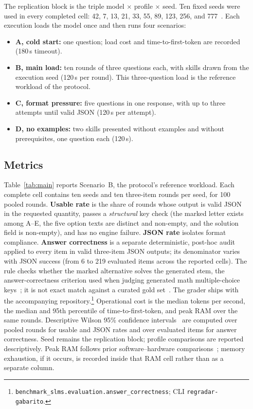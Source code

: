 \documentclass[fleqn,10pt]{JLA_article}
\begin{document}
The replication block is the triple model $\times$ profile $\times$ seed. Ten fixed seeds were used in every completed cell: 42, 7, 13, 21, 33, 55, 89, 123, 256, and 777~\autocite{anonymous2026benchmark}. Each execution loads the model once and then runs four scenarios:
\begin{itemize}
  \item \textbf{A, cold start:} one question; load cost and time-to-first-token are recorded (180\,s timeout).
  \item \textbf{B, main load:} ten rounds of three questions each, with skills drawn from the execution seed (120\,s per round). This three-question load is the reference workload of the protocol.
  \item \textbf{C, format pressure:} five questions in one response, with up to three attempts until valid JSON (120\,s per attempt).
  \item \textbf{D, no examples:} two skills presented without examples and without prerequisites, one question each (120\,s).
\end{itemize}

\subsection{Metrics}
Table~\ref{tab:main} reports Scenario~B, the protocol's reference workload. Each complete cell contains ten seeds and ten three-item rounds per seed, for 100 pooled rounds. \textbf{Usable rate} is the share of rounds whose output is valid JSON in the requested quantity, passes a \emph{structural} key check (the marked letter exists among A--E, the five option texts are distinct and non-empty, and the solution field is non-empty), and has no engine failure. \textbf{JSON rate} isolates format compliance. \textbf{Answer correctness} is a separate deterministic, post-hoc audit applied to every item in valid three-item JSON outputs; its denominator varies with JSON success (from 6 to 219 evaluated items across the reported cells). The rule checks whether the marked alternative solves the generated stem, the answer-correctness criterion used when judging generated math multiple-choice keys~\autocite{lee2024hedge}; it is not exact match against a curated gold set~\autocite{anonymous2026benchmark}. The grader ships with the accompanying repository.\footnote{\texttt{benchmark\_slms.evaluation.answer\_correctness}; CLI \texttt{regradar-gabarito}.} Operational cost is the median tokens per second, the median and 95th percentile of time-to-first-token, and peak RAM over the same rounds. Descriptive Wilson 95\% confidence intervals~\autocite{brown2001interval} are computed over pooled rounds for usable and JSON rates and over evaluated items for answer correctness. Seed remains the replication block; profile comparisons are reported descriptively. Peak RAM follows prior software--hardware comparisons~\autocite{sarmanho2026ocr}; memory exhaustion, if it occurs, is recorded inside that RAM cell rather than as a separate column.
\end{document}
